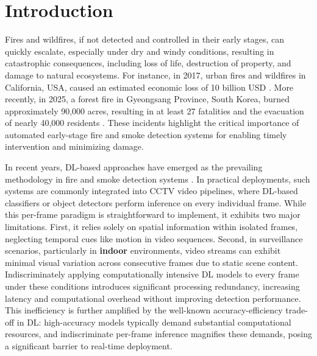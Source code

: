 \documentclass[final,3p,times,twocolumn]{elsarticle}
\begin{document}
\section{Introduction}\label{sec:introduction}

Fires and wildfires, if not detected and controlled in their early
stages, can quickly escalate, especially under dry and windy conditions,
resulting in catastrophic consequences, including loss of life,
destruction of property, and damage to natural ecosystems. For instance,
in 2017, urban fires and wildfires in California, USA, caused an
estimated economic loss of 10 billion USD \cite{californiafire:online}.
More recently, in 2025, a forest fire in Gyeongsang Province, South
Korea, burned approximately 90,000 acres, resulting in at least 27
fatalities and the evacuation of nearly 40,000 residents
\cite{southkoreafire:online}. These incidents highlight the critical
importance of automated early-stage fire and smoke detection systems for
enabling timely intervention and minimizing damage.

In recent years, DL-based approaches have emerged as the prevailing
methodology in fire and smoke detection systems
\cite{cheng2024visual,gragnaniello2024fire}. In practical deployments,
such systems are commonly integrated into CCTV video pipelines, where
DL-based classifiers or object detectors perform inference on every
individual frame. While this per-frame paradigm is straightforward to
implement, it exhibits two major limitations. First, it relies solely on
spatial information within isolated frames, neglecting temporal cues
like motion in video sequences. Second, in surveillance scenarios,
particularly in \textbf{indoor} environments, video streams can exhibit
minimal visual variation across consecutive frames due to static scene
content. Indiscriminately applying computationally intensive DL models
to every frame under these conditions introduces significant processing
redundancy, increasing latency and computational overhead without
improving detection performance. This inefficiency is further amplified
by the well-known accuracy-efficiency trade-off in DL: high-accuracy
models typically demand substantial computational resources, and
indiscriminate per-frame inference magnifies these demands, posing a
significant barrier to real-time deployment.
\end{document}

